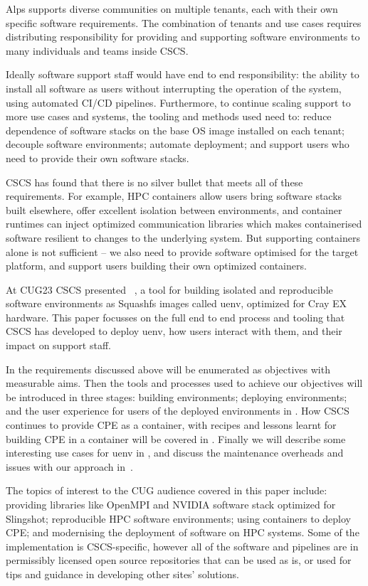 Alps supports diverse communities on multiple tenants, each with their own specific software requirements.
The combination of tenants and use cases requires distributing responsibility for providing and supporting software environments to many individuals and teams inside CSCS.

Ideally software support staff would have end to end responsibility: the ability to install all software as users without interrupting the operation of the system, using automated CI/CD pipelines.
Furthermore, to continue scaling support to more use cases and systems, the tooling and methods used need to: reduce dependence of software stacks on the base OS image installed on each tenant; decouple software environments; automate deployment; and support users who need to provide their own software stacks.

CSCS has found that there is no silver bullet that meets all of these requirements.
For example, HPC containers allow users bring software stacks built elsewhere, offer excellent isolation between environments, and container runtimes can inject optimized communication libraries which makes containerised software resilient to changes to the underlying system.
But supporting containers alone is not sufficient -- we also need to provide software optimised for the target platform, and support users building their own optimized containers.

At CUG23 CSCS presented \stackinator~\cite{uenv2023}, a tool for building isolated and reproducible software environments as Squashfs images called uenv, optimized for Cray EX hardware.
This paper focusses on the full end to end process and tooling that CSCS has developed to deploy uenv, how users interact with them, and their impact on support staff.

In  the requirements discussed above will be enumerated as objectives with measurable aims.
Then the tools and processes used to achieve our objectives will be introduced in three stages: building environments; deploying environments; and the user experience for users of the deployed environments in .
How CSCS continues to provide CPE as a container, with recipes and lessons learnt for building CPE in a container will be covered in .
Finally we will describe some interesting use cases for uenv in , and discuss the maintenance overheads and issues with our approach in~.

The topics of interest to the CUG audience covered in this paper include: providing libraries like OpenMPI and NVIDIA software stack optimized for Slingshot; reproducible HPC software environments; using containers to deploy CPE; and modernising the deployment of software on HPC systems.
Some of the implementation is CSCS-specific, however all of the software and pipelines are in permissibly licensed open source repositories that can be used as is, or used for tips and guidance in developing other sites' solutions.


